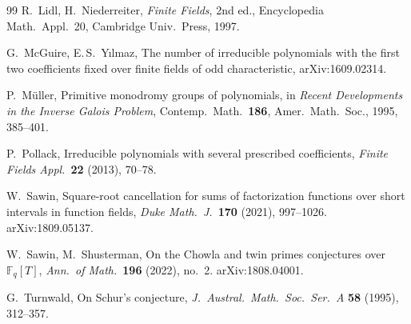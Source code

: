 \documentclass[11pt,a4paper]{article}
\theoremstyle{definition}
\theoremstyle{remark}
\begin{document}
\begin{thebibliography}{99}
R.~Lidl, H.~Niederreiter,
\textit{Finite Fields}, 2nd ed., Encyclopedia Math.\ Appl.\ 20, Cambridge Univ.\ Press, 1997.

G.~McGuire, E.\,S.~Y\i lmaz,
The number of irreducible polynomials with the first two coefficients fixed over finite fields of
odd characteristic, arXiv:1609.02314.

P.~M\"uller,
Primitive monodromy groups of polynomials, in
\textit{Recent Developments in the Inverse Galois Problem}, Contemp.\ Math.\ \textbf{186},
Amer.\ Math.\ Soc., 1995, 385--401.

P.~Pollack,
Irreducible polynomials with several prescribed coefficients,
\textit{Finite Fields Appl.}\ \textbf{22} (2013), 70--78.

W.~Sawin,
Square-root cancellation for sums of factorization functions over short intervals in function fields,
\textit{Duke Math.\ J.}\ \textbf{170} (2021), 997--1026. arXiv:1809.05137.

W.~Sawin, M.~Shusterman,
On the Chowla and twin primes conjectures over $\mathbb F_q[T]$,
\textit{Ann.\ of Math.}\ \textbf{196} (2022), no.~2. arXiv:1808.04001.

G.~Turnwald,
On Schur's conjecture,
\textit{J.\ Austral.\ Math.\ Soc.\ Ser.~A} \textbf{58} (1995), 312--357.

\end{thebibliography}
\end{document}

